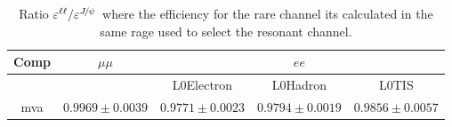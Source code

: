 \begin{table}[h!]
\centering
\caption{Ratio $\varepsilon^{\ell\ell} / \varepsilon^{\jpsi}$ where the efficiency for the
rare channel its calculated in the same \qsq rage used to select the resonant channel.}
\begin{tabular}{|c|c|c|c|c|}
\hline Comp 			&  $\mu\mu$  				& \multicolumn {3}{c|}{$ee$}  \\ \hline
				&   &  L0Electron 	& L0Hadron 	& L0TIS \\ \hline
mva  & $ 0.9969  \pm  0.0039 $ & $ 0.9771  \pm  0.0023 $ & $ 0.9794  \pm  0.0019 $ & $ 0.9856  \pm  0.0057 $ \\ 
\hline
\end{tabular}
\label{tab:mva_in_jpsibin}
\end{table}

\clearpage








